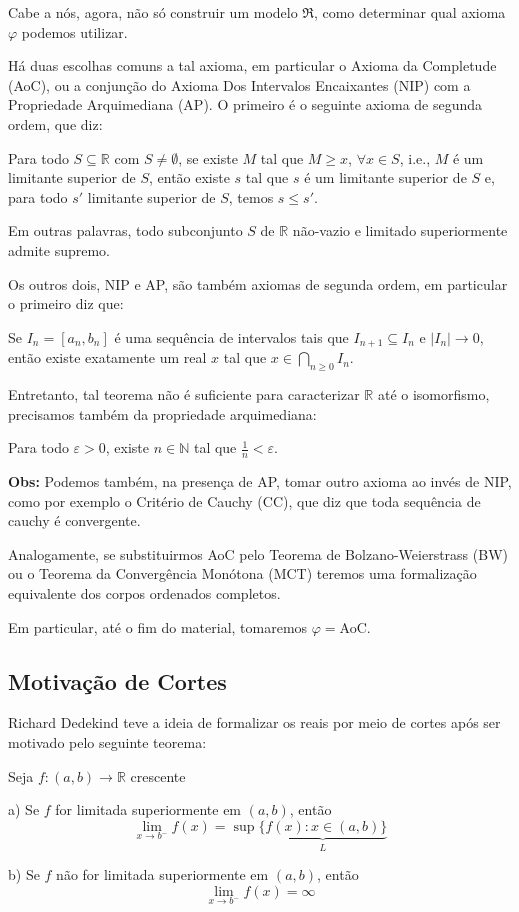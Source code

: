 \documentclass[11pt]{article}
\newcommand{\mf}[1]{\mathfrak{#1}}
\newcommand{\mbb}[1]{\mathbb{#1}}
\newcommand{\cl}[1]{\colorlet{shadecolor}{#1}}
\begin{document}
Cabe a nós, agora, não só construir um modelo $\mf{R}$, como determinar qual axioma $\varphi$ podemos utilizar.

Há duas escolhas comuns a tal axioma, em particular o Axioma da Completude (AoC), ou a conjunção do Axioma Dos Intervalos Encaixantes (NIP) com a Propriedade Arquimediana (AP). O primeiro é o seguinte axioma de segunda ordem, que diz:

Para todo $S\subseteq\mbb{R}$ com $S\neq\emptyset$, se existe $M$ tal que $M\geq x$, $\forall x\in S$, i.e., $M$ é um limitante superior de $S$, então existe $s$ tal que $s$ é um limitante superior de $S$ e, para todo $s'$ limitante superior de $S$, temos $s\leq s'$.

Em outras palavras, todo subconjunto $S$ de $\mbb{R}$ não-vazio e limitado superiormente admite supremo.

Os outros dois, NIP e AP, são também axiomas de segunda ordem, em particular o primeiro diz que:

Se $I_n=[a_n,b_n]$ é uma sequência de intervalos tais que $I_{n+1}\subseteq I_n$ e $|I_n|\to0$, então existe exatamente um real $x$ tal que $x\in\bigcap_{n\geq0}I_n$.

Entretanto, tal teorema não é suficiente para caracterizar $\mbb{R}$ até o isomorfismo, precisamos também da propriedade arquimediana:

Para todo $\varepsilon>0$, existe $n\in\mbb{N}$ tal que $\frac{1}{n}<\varepsilon$.

\textbf{Obs:} Podemos também, na presença de AP, tomar outro axioma ao invés de NIP, como por exemplo o Critério de Cauchy (CC), que diz que toda sequência de cauchy é convergente.

Analogamente, se substituirmos AoC pelo Teorema de Bolzano-Weierstrass (BW) ou o Teorema da Convergência Monótona (MCT) teremos uma formalização equivalente dos  corpos ordenados completos.

Em particular, até o fim do material, tomaremos $\varphi=$AoC.

\subsection{Motivação de Cortes}

Richard Dedekind teve a ideia de formalizar os reais por meio de cortes após ser motivado pelo seguinte teorema:

\cl{blue!15}
\begin{shaded}
\begin{theorem}
    Seja $f:(a,b)\to\mbb{R}$ crescente

    a) Se $f$ for limitada superiormente em $(a, b)$, então
    $$\lim_{x\to b^-}f(x)=\sup\underbrace{\{f(x):x\in(a,b)\}}_L$$

    b) Se $f$ não for limitada superiormente em $(a,b)$, então
    $$\lim_{x\to b^-}f(x)=\infty$$
\end{theorem}
\end{shaded}
\end{document}
